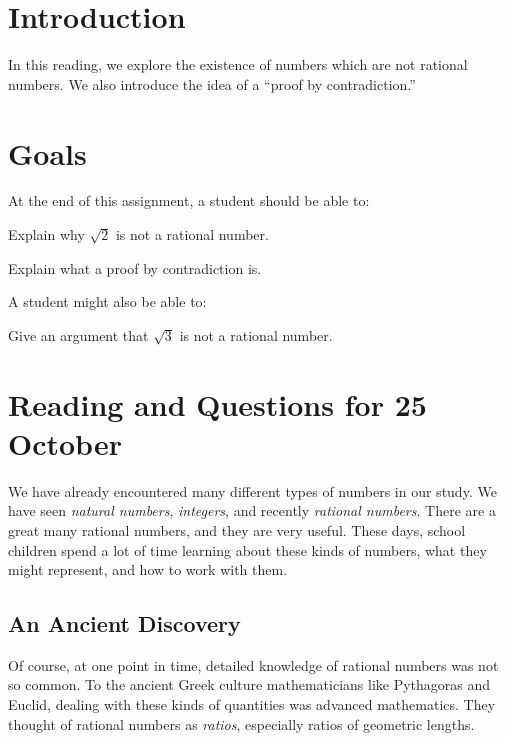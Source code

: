 \documentclass[12pt,letterpaper]{article}
\theoremstyle{definition}
\begin{document}
\setlength{\parskip}{1ex plus 0.5ex minus 0.2ex}
\setlength{\parindent}{0pt}

\pagestyle{fancy}
\cfoot{}

\section*{Introduction}
In this reading, we explore the existence of numbers which are not rational numbers.
We also introduce the idea of a ``proof by contradiction.''

\section*{Goals}
At the end of this assignment, a student should be able to:
\begin{compactitem}
\item Explain why $\sqrt{2}$ is not a rational number.
\item Explain what a proof by contradiction is.
\end{compactitem}
A student might also be able to:
\begin{compactitem}
\item Give an argument that $\sqrt{3}$ is not a rational number.
\end{compactitem}

\section*{Reading and Questions for 25 October}

We have already encountered many different types of numbers in our study. 
We have seen \emph{natural numbers}, \emph{integers}, and recently \emph{rational numbers}.
There are a great many rational numbers, and they are very useful.
These days, school children spend a lot of time learning about these kinds of numbers, what they might represent, and how to work with them.

\subsection*{An Ancient Discovery}

Of course, at one point in time, detailed knowledge of rational numbers was not so common. 
To the ancient Greek culture mathematicians like Pythagoras and Euclid, dealing with these kinds of quantities was advanced mathematics.
They thought of rational numbers as \emph{ratios}, especially ratios of geometric lengths.
\end{document}
